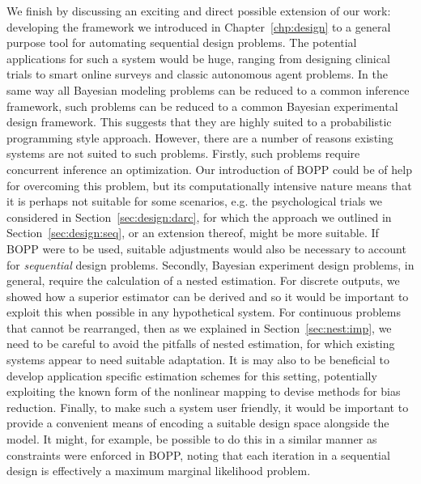 We finish by discussing an exciting and direct possible extension of our work: developing the framework we introduced 
in Chapter~\ref{chp:design} to a general purpose tool for automating sequential design problems.
The potential applications for such a system would be huge,  ranging from designing clinical trials to
smart online surveys and classic autonomous agent problems.  In  the same way all Bayesian modeling
problems can be reduced to a common inference framework, such problems can be reduced to a
common Bayesian experimental design framework. This suggests that they are highly suited to a
probabilistic programming style approach.  However, there are a number of reasons existing systems
are not suited to such problems.  Firstly, such problems require concurrent inference 
an optimization.  Our introduction of BOPP could be of help for overcoming this problem,
but its computationally intensive nature means that it is perhaps not suitable for
some scenarios, e.g. the psychological trials we considered in Section~\ref{sec:design:darc},
for which the approach we outlined in Section~\ref{sec:design:seq}, or an extension thereof,
might be more suitable.  If BOPP were to be used, suitable adjustments would also be necessary
to account for \emph{sequential} design problems.
Secondly, Bayesian experiment design problems, in general, require the calculation of a nested 
estimation.  For discrete outputs, we showed how a superior estimator can be derived and so
it would be important to exploit this when possible in any hypothetical system.  For continuous problems that
cannot be rearranged, then as we explained in Section~\ref{sec:nest:imp}, we need to be careful
to avoid the pitfalls of nested estimation, for which existing systems appear to need suitable
adaptation.  It is may also to be beneficial to develop application specific estimation schemes
for this setting, potentially exploiting the known form of the nonlinear mapping to
devise methods for bias reduction.  Finally, to make such a system user friendly, it would
be important to provide a convenient means of encoding a suitable design space alongside the
model.  It might, for example, be possible to do this in a similar manner as constraints were enforced
in BOPP, noting that each iteration in a sequential design is effectively a maximum marginal likelihood
problem.

